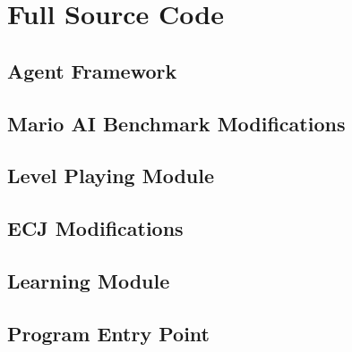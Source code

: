 \section{Full Source Code}

\subsection{Agent Framework}

\subsection{Mario AI Benchmark Modifications}

\subsection{Level Playing Module}

\subsection{ECJ Modifications}

\subsection{Learning Module}

\subsection{Program Entry Point}